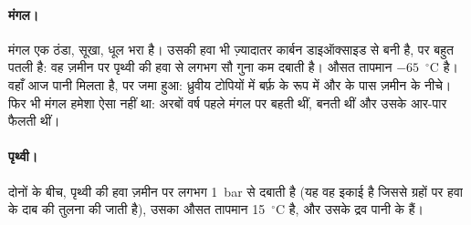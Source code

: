 \paragraph{मंगल।} मंगल एक ठंडा, सूखा, धूल भरा  है। उसकी हवा भी ज़्यादातर
कार्बन डाइऑक्साइड से बनी है, पर बहुत पतली है: वह ज़मीन पर पृथ्वी की हवा से लगभग सौ
गुना कम दबाती है। औसत तापमान
$-65$~$^\circ$C है। वहाँ आज पानी मिलता है, पर जमा हुआ: ध्रुवीय टोपियों में
बर्फ़ के रूप में और  के पास ज़मीन के नीचे। फिर भी मंगल हमेशा ऐसा नहीं था: अरबों
वर्ष पहले मंगल पर  बहती थीं,  बनती थीं
और  उसके आर-पार फैलती थीं।

\paragraph{पृथ्वी।} दोनों के बीच, पृथ्वी की हवा ज़मीन पर लगभग 1~bar से दबाती है
(यह वह इकाई है जिससे ग्रहों पर हवा के दाब की तुलना की जाती है), उसका औसत तापमान
15~$^\circ$C है, और उसके 
द्रव पानी के हैं।

